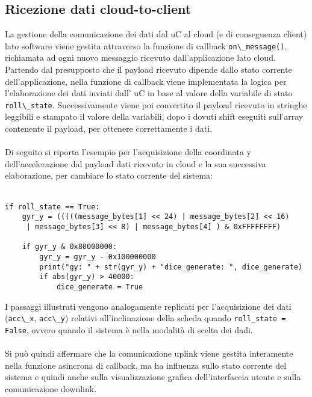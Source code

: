 \subsection{Ricezione dati cloud-to-client}
La gestione della comunicazione dei dati dal uC al cloud (e di conseguenza client) lato software viene gestita attraverso la funzione di callback 
\Verb|on\_message()|, richiamata ad ogni nuovo messaggio ricevuto dall'applicazione lato cloud. Partendo dal presupposto che il payload ricevuto
dipende dallo stato corrente dell'applicazione, nella funzione di callback viene implementata la logica per l'elaborazione dei dati inviati dall' uC in base al valore
della variabile di stato \Verb|roll\_state|. Successivamente viene poi convertito il payload ricevuto in stringhe leggibili e stampato il valore della variabili, 
dopo i dovuti shift eseguiti sull'array contenente il payload, per ottenere correttamente i dati.
\\\\Di seguito si riporta l'esempio per l'acquisizione della coordinata y dell'accelerazione dal payload dati ricevuto in cloud e la sua 
successiva elaborazione, per cambiare lo stato corrente del sistema:\\\\
\begin{verbatim}
if roll_state == True:
    gyr_y = (((((message_bytes[1] << 24) | message_bytes[2] << 16)
     | message_bytes[3] << 8) | message_bytes[4] ) & 0xFFFFFFFF)  

    if gyr_y & 0x80000000:
        gyr_y = gyr_y - 0x100000000
        print("gy: " + str(gyr_y) + "dice_generate: ", dice_generate)
        if abs(gyr_y) > 40000:
            dice_generate = True
\end{verbatim}
I passaggi illustrati vengono analogamente replicati per l'acquisizione dei dati (\Verb|acc\_x|, \Verb|acc\_y|) relativi all'inclinazione della scheda
quando \Verb|roll_state = False|, ovvero quando il sistema è nella modalità di scelta dei dadi.
\\\\Si può quindi affermare che la comunicazione uplink viene gestita interamente nella funzione asincrona di callback, ma ha influenza 
sullo stato corrente del sistema e quindi anche sulla visualizzazione grafica dell'interfaccia utente e sulla comunicazione downlink.

